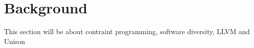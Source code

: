 \chapter{Background}

This section will be about contraint programming, software diversity, LLVM and Unison








